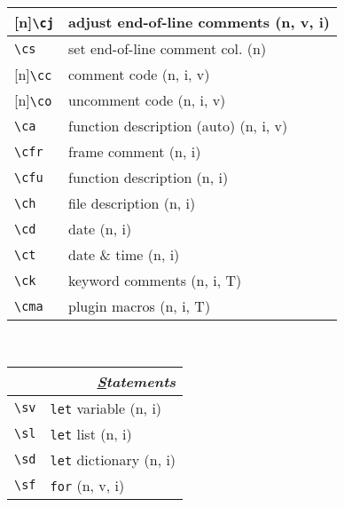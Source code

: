 \documentclass[oneside,10pt,landscape,DIV16]{scrartcl}
\newcommand{\Rep}{{\scriptsize{[n]}}}
\begin{document}
\begin{multicols}{3}
\begin{center}
\begin{tabular}[]{|p{11mm}|p{58mm}|}
\hline \Rep\verb'\cj'   & adjust end-of-line comments       \hfill (n, v, i)\\
\hline     \verb'\cs'   & set end-of-line comment col.      \hfill (n)   \\
\hline \Rep\verb'\cc'   & comment code                      \hfill (n, i, v)\\
\hline \Rep\verb'\co'   & uncomment code                    \hfill (n, i, v)\\
\hline     \verb'\ca'   & function description (auto)       \hfill (n, i, v)\\
%
\hline     \verb'\cfr'  & frame comment                     \hfill (n, i)\\
\hline     \verb'\cfu'  & function description              \hfill (n, i)\\
\hline     \verb'\ch'   & file description                  \hfill (n, i)\\
\hline     \verb'\cd'   & date                              \hfill (n, i)\\
\hline     \verb'\ct'   & date \& time                      \hfill (n, i)\\
\hline
%
\hline     \verb'\ck'   & keyword comments                  \hfill (n, i, T)\\
\hline     \verb'\cma'  & plugin macros                     \hfill (n, i, T)\\
\hline
\end{tabular}\\
%
%
\begin{tabular}[]{|p{11mm}|p{58mm}|}
\hline
\multicolumn{2}{|r|}{\textsl{\underline{S}tatements}}\\[1.0ex]
\hline \verb'\sv'     & \verb'let' variable                              \hfill (n, i)\\
\hline \verb'\sl'     & \verb'let' list                                  \hfill (n, i)\\
\hline \verb'\sd'     & \verb'let' dictionary                            \hfill (n, i)\\
\hline \verb'\sf'     & \verb'for'                                       \hfill (n, v, i)\\

\end{tabular}
\end{center}
\end{multicols}
\end{document}

